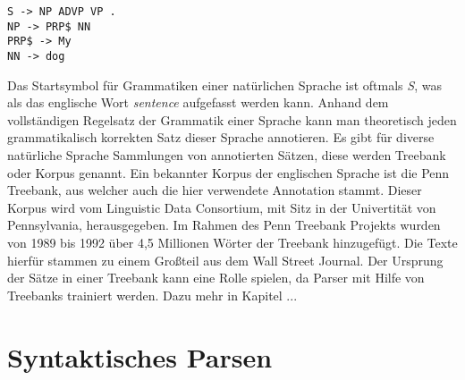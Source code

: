 \begin{lstlisting}
S -> NP ADVP VP .
NP -> PRP$ NN
PRP$ -> My
NN -> dog
\end{lstlisting}
Das Startsymbol für Grammatiken einer natürlichen Sprache ist oftmals \textit{S}, was als das englische Wort \textit{sentence} aufgefasst werden kann. %
Anhand dem vollständigen Regelsatz der Grammatik einer Sprache kann man theoretisch jeden grammatikalisch korrekten Satz dieser Sprache annotieren. Es gibt für diverse natürliche Sprache Sammlungen von annotierten Sätzen, diese werden Treebank oder Korpus genannt. Ein bekannter Korpus der englischen Sprache ist die Penn Treebank, aus welcher auch die hier verwendete Annotation stammt. Dieser Korpus wird vom Linguistic Data Consortium, mit Sitz in der Univertität von Pennsylvania, herausgegeben. %
Im Rahmen des Penn Treebank Projekts wurden von 1989 bis 1992 über 4,5 Millionen Wörter der Treebank hinzugefügt. Die Texte hierfür stammen zu einem Großteil aus dem Wall Street Journal. Der Ursprung der Sätze in einer Treebank kann eine Rolle spielen, da Parser mit Hilfe von Treebanks trainiert werden. Dazu mehr in Kapitel ... %

\section{Syntaktisches Parsen}
\label{sec:nlp:syn-parsen}

